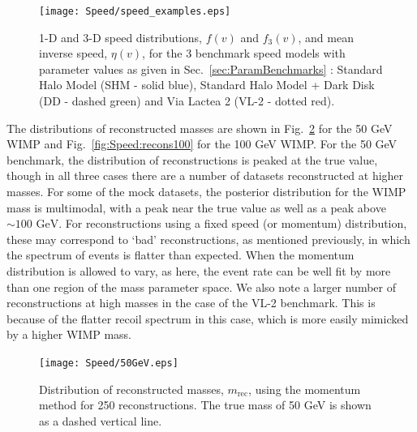  \begin{figure}[t]
\centering
\texttt{[image: Speed/speed\_examples.eps]}
\caption[Speed distributions and mean inverse speeds for the Standard Halo Model (SHM), SHM + Dark disk (SHM+DD) and Via Lactea 2 (VL-2) distribution functions]{1-D and 3-D speed distributions, \(f(v)\) and \(f_3(v)\),  and mean inverse speed, \(\eta(v)\), for the 3 benchmark speed models with parameter values as given in Sec.\ \ref{sec:ParamBenchmarks} : Standard Halo Model (SHM - solid blue), Standard Halo Model + Dark Disk (DD - dashed green) and Via Lactea 2 (VL-2 - dotted red). }
  \label{fig:Speed:benchmarkf}
\end{figure}


The distributions of reconstructed masses are shown in Fig.\ \ref{fig:Speed:recons50} for the 50 GeV WIMP and Fig.\ \ref{fig:Speed:recons100} for the 100 GeV WIMP. For the 50 GeV benchmark, the distribution of reconstructions is peaked at the true value, though in all three cases there are a number of datasets reconstructed at higher masses. For some of the mock datasets, the posterior distribution for the WIMP mass is multimodal, with a peak near the true value as well as a peak above \(\sim 100 \textrm{ GeV}\). For reconstructions using a fixed speed (or momentum) distribution, these may correspond to `bad' reconstructions, as mentioned previously, in which the spectrum of events is flatter than expected. When the momentum distribution is allowed to vary, as here, the event rate can be well fit by more than one region of the mass parameter space.  We also note a larger number of reconstructions at high masses in the case of the VL-2 benchmark. This is because of the flatter recoil spectrum in this case, which is more easily mimicked by a higher WIMP mass.

 \begin{figure}[t]
\centering
\texttt{[image: Speed/50GeV.eps]}
\caption[Distribution of reconstructed masses using the binned momentum distribution for a 50 GeV WIMP with SHM, SHM+DD and VL2 distribution functions]{Distribution of reconstructed masses, \(m_\textrm{rec}\), using the momentum method for 250 reconstructions. The true mass of 50 GeV is shown as a dashed vertical line.}
  \label{fig:Speed:recons50}
\end{figure}



